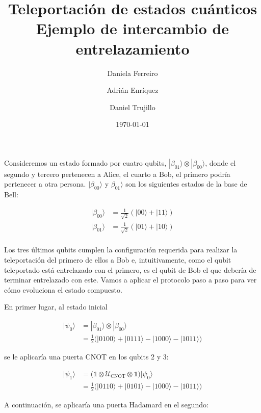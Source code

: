 \documentclass{article}
\title{%
  Teleportación de estados cuánticos \\ 
  \large Ejemplo de intercambio de entrelazamiento
}
\author{
  Daniela Ferreiro \and 
  Adrián Enríquez \and 
  Daniel Trujillo
}
\date{\today}
\begin{document}
\maketitle

Consideremos un estado formado por cuatro qubits,
$|\beta_{01}\rangle \otimes |\beta_{00}\rangle$, donde el segundo
y tercero pertenecen a Alice, el cuarto a Bob, el primero podría
pertenecer a otra persona. $|\beta_{00}\rangle$
y $\beta_{01}\rangle$ son los siguientes estados de la base de Bell:

\begin{align*}
  |\beta_{00}\rangle &= 
    \frac{1}{\sqrt{2}}(|00\rangle + |11\rangle) \\
  |\beta_{01}\rangle &= 
    \frac{1}{\sqrt{2}}(|01\rangle + |10\rangle) \\
\end{align*}

Los tres últimos qubits cumplen la configuración requerida para
realizar la teleportación del primero de ellos a Bob e,
intuitivamente, como el qubit teleportado está entrelazado con el
primero, es el qubit de Bob el que debería de terminar entrelazado
con este. Vamos a aplicar el protocolo paso a paso para ver cómo
evoluciona el estado compuesto.

En primer lugar, al estado inicial

\begin{align*}
  |\psi_0\rangle &= |\beta_{01}\rangle \otimes |\beta_{00}\rangle \\ 
         &= \frac{1}{2}\Big(
            |0100\rangle + |0111\rangle -|1000\rangle - |1011\rangle
         \Big)
\end{align*}

se le aplicaría una puerta CNOT en los qubits 2 y 3:

\begin{align*}
  |\psi_1\rangle 
        &= \Big(
          \mathbb{1} 
          \otimes \mathcal{U} _\text{CNOT}
          \otimes \mathbb{1}
          \Big)|\psi_0\rangle \\ 
        &= \frac{1}{2}\Big(
          |0110\rangle + |0101\rangle -|1000\rangle - |1011\rangle
        \Big)
\end{align*}

A continuación, se aplicaría una puerta Hadamard en el segundo:
\end{document}
